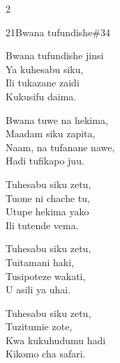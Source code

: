 \documentclass{article}
\begin{document}
\begin{multicols}{2}
\begin{hymn}{21}{Bwana tufundishe}{\#34}
\begin{stanza}
Bwana tufundishe jinsi\\
Ya kuhesabu siku,\\
Ili tukazane zaidi\\
Kukusifu daima.
\end{stanza}
\begin{chorus}
Bwana tuwe na hekima,\\
Maadam siku zapita,\\
Naam, na tufanane nawe,\\
Hadi tufikapo juu.
\end{chorus}
\begin{stanza}
Tuhesabu siku zetu,\\
Tuone ni chache tu,\\
Utupe hekima yako\\
Ili tutende vema.
\end{stanza}
\begin{stanza}
Tuhesabu siku zetu,\\
Tuitamani haki,\\
Tusipoteze wakati,\\
U asili ya uhai.
\end{stanza}
\begin{stanza}
Tuhesabu siku zetu,\\
Tuzitumie zote,\\
Kwa kukuhudumu hadi\\
Kikomo cha safari.
\end{stanza}
\end{hymn}


\end{multicols}
\end{document}
